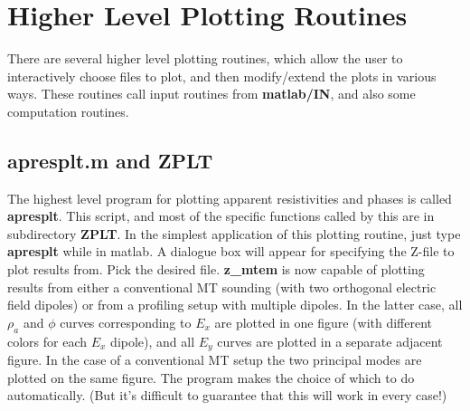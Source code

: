 \section{Higher Level Plotting Routines}

There are several higher level plotting routines, which allow the user to
interactively choose files to plot, and then modify/extend the plots in various
ways.  These routines call input routines from {\bf matlab/IN}, and
also some computation routines.

\subsection{apresplt.m and ZPLT}

The highest level program for plotting apparent resistivities and phases is
called {\bf apresplt}. This script, and most of the specific functions
called by this are in subdirectory {\bf ZPLT}.
In the simplest application of this plotting routine, just type
{\bf apresplt} while in matlab.  A dialogue box will appear for specifying the
Z-file to plot results from. Pick the desired file.   {\bf z\_mtem}
is now capable of plotting results from either a conventional MT sounding
(with two orthogonal electric field dipoles) or from a profiling
setup with multiple dipoles.  In the latter case, all 
$\rho_a$ and $\phi$ curves corresponding to $E_x$ are plotted in one
figure (with different colors for each $E_x$ dipole), and
all $E_y$ curves are plotted in a separate adjacent figure.  In
the case of a conventional MT setup the two principal modes are plotted
on the same figure.  The program makes the choice of which to do
automatically. (But it's difficult to guarantee that this will work in
every case!)

